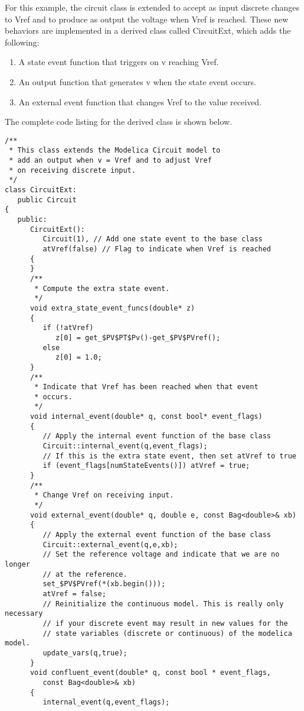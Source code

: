For this example, the circuit class is extended to accept as input discrete changes to Vref and to produce as output the voltage when Vref is reached. These new behaviors are implemented in a derived class called CircuitExt, which adds the following:
\begin{enumerate}
\item A state event function that triggers on v reaching Vref.
\item An output function that generates v when the state event occurs.
\item An external event function that changes Vref to the value received.
\end{enumerate}
The complete code listing for the derived class is shown below.
\begin{verbatim}
/**
 * This class extends the Modelica Circuit model to
 * add an output when v = Vref and to adjust Vref
 * on receiving discrete input.
 */
class CircuitExt:
   public Circuit
{
   public:
      CircuitExt():
         Circuit(1), // Add one state event to the base class
         atVref(false) // Flag to indicate when Vref is reached
      {
      }
      /**
       * Compute the extra state event.
       */
      void extra_state_event_funcs(double* z)
      {
         if (!atVref)
            z[0] = get_$PV$PT$Pv()-get_$PV$PVref();
         else
            z[0] = 1.0;
      }
      /**
       * Indicate that Vref has been reached when that event
       * occurs.
       */
      void internal_event(double* q, const bool* event_flags)
      {
         // Apply the internal event function of the base class
         Circuit::internal_event(q,event_flags);
         // If this is the extra state event, then set atVref to true
         if (event_flags[numStateEvents()]) atVref = true;
      }
      /**
       * Change Vref on receiving input.
       */
      void external_event(double* q, double e, const Bag<double>& xb)
      {
         // Apply the external event function of the base class
         Circuit::external_event(q,e,xb);
         // Set the reference voltage and indicate that we are no longer
         // at the reference.
         set_$PV$PVref(*(xb.begin()));
         atVref = false;
         // Reinitialize the continuous model. This is really only necessary
         // if your discrete event may result in new values for the 
         // state variables (discrete or continuous) of the modelica model.
         update_vars(q,true);
      }
      void confluent_event(double* q, const bool * event_flags,
         const Bag<double>& xb)
      {
         internal_event(q,event_flags);

\end{verbatim}
